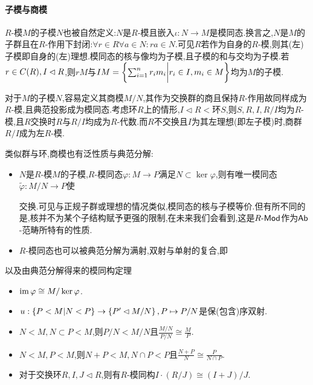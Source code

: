 \documentclass[11pt]{article} %
\begin{document}
\paragraph{子模与商模}
$R$-模$M$的子模$N$也被自然定义:$N$是$R$-模且嵌入$\iota:N\to M$是模同态.换言之,$N$是$M$的子群且在$R$-作用下封闭:$\forall r\in R\forall a\in N: ra\in N$.可见$R$若作为自身的$R$-模,则其(左)子模即自身的(左)理想.模同态的核与像均为子模,且子模的和与交均为子模.若$r\in C(R), I\lhd R$,则$rM$与$IM=\left\{\sum_{i=1}^n r_im_i\bigg| r_i\in I,m_i\in M\right\}$均为$M$的子模.

对于$M$的子模$N$,容易定义其商模$M/N$,其作为交换群的商且保持$R$-作用故同样成为$R$-模,且典范投影成为模同态.考虑环$R$上的情形,$I\lhd R<$环$S$,则$S,R,I,R/I$均为$R$-模,且$R$交换时$R$与$R/I$均成为$R$-代数.而$R$不交换且$I$为其左理想(即左子模)时,商群$R/I$成为左$R$-模.

类似群与环,商模也有泛性质与典范分解:
\begin{itemize}
    \item $N$是$R$-模$M$的子模,$R$-模同态$\varphi:M\to P$满足$N\subset \ker\varphi$,则有唯一模同态$\tilde{\varphi}:M/N\to P$使\\
    交换.可见与正规子群或理想的情况类似,模同态的核与子模等价.但有所不同的是,核并不为某个子结构赋予更强的限制,在未来我们会看到,这是$R\textrm{-}\mathsf{Mod}$作为$\mathsf{Ab}$-范畴所特有的性质.
    \item $R$-模同态也可以被典范分解为满射,双射与单射的复合,即
\end{itemize}
以及由典范分解得来的模同构定理
\begin{itemize}
    \item $\operatorname{im}\varphi\cong M/\ker\varphi$.
    \item $u:\left\{P<M|N<P\right\}\to \left\{P'\lhd M/N\right\}, P\mapsto P/N$是保(包含)序双射.
    \item $N<M, N\subset P<M$,则$P/N<M/N$且$\frac{M/N}{P/N}\cong \frac{M}{P}$.
    \item $N<M, P<M$,则$N+P<M, N\cap P<P$且$\frac{N+P}{N}\cong \frac{P}{N\cap P}$.
    \item 对于交换环$R, I,J\lhd R$,则有$R$-模同构$I\cdot (R/J)\cong (I+J)/J$.
\end{itemize}
\end{document}
